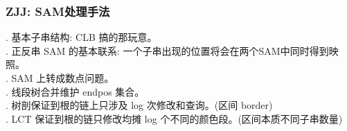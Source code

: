 \subsubsection*{ZJJ: SAM处理手法}
. 基本子串结构: CLB 搞的那玩意。\\	
. 正反串 SAM 的基本联系: 一个子串出现的位置将会在两个SAM中同时得到映照。\\	
. SAM 上转成数点问题。\\	
. 线段树合并维护 endpos 集合。\\	
. 树剖保证到根的链上只涉及 log 次修改和查询。(区间 border) \\	
. LCT 保证到根的链只修改均摊 log 个不同的颜色段。(区间本质不同子串数量)